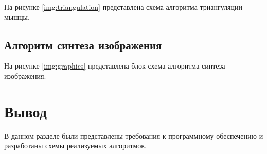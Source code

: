 На рисунке \ref{img:triangulation} представлена схема алгоритма триангуляции мышцы.


\clearpage
\subsection{Алгоритм синтеза изображения}

На рисунке \ref{img:graphics} представлена блок-схема алгоритма синтеза изображения.


\section*{Вывод}

В данном разделе были представлены требования к программному обеспечению и разработаны схемы реализуемых алгоритмов.
